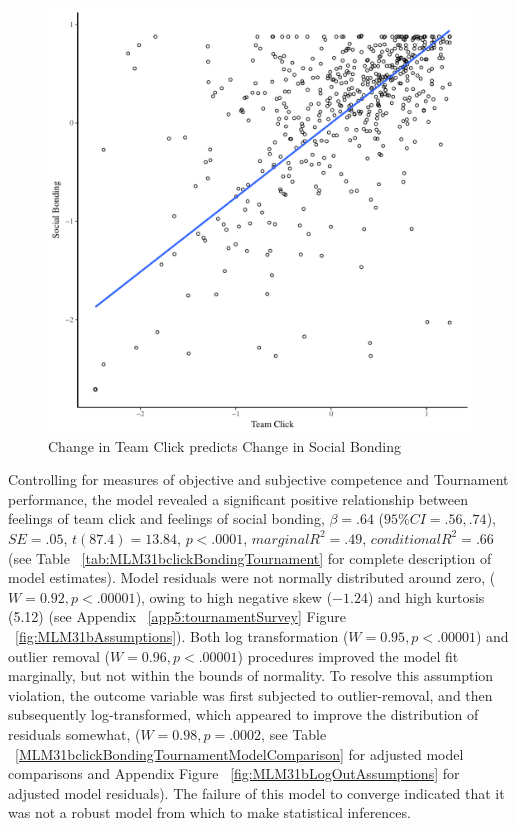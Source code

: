         \begin{figure}[htbp]
          \centering
        \includegraphics[scale=.5]{images/clickBondOverallBasicXY.pdf}
          \caption{Change in Team Click predicts Change in Social Bonding}
          \label{fig:clickBondOverallBasicXY}
        \end{figure}

   Controlling for measures of objective and subjective competence and Tournament performance, the model revealed a significant positive relationship between feelings of team click and feelings of social bonding, $\beta = .64$ ($95\% CI = .56, .74$), $SE = .05$, $t(87.4) = 13.84$, $p < .0001$, $marginal R^2 = .49$, $conditional R^2 = .66$ (see Table ~\ref{tab:MLM31bclickBondingTournament} for complete description of model estimates). Model residuals were not normally distributed around zero, ($W = 0.92, p < .00001$), owing to high negative skew ($-1.24$) and high kurtosis (5.12) (see Appendix ~\ref{app5:tournamentSurvey} Figure ~\ref{fig:MLM31bAssumptions}).
   Both log transformation ($W = 0.95, p < .00001$) and outlier removal ($W = 0.96, p < .00001$) procedures improved the model fit marginally, but not within the bounds of normality.  To resolve this assumption violation, the outcome variable was first subjected to outlier-removal, and then subsequently log-transformed, which appeared to improve the distribution of residuals somewhat, ($W = 0.98, p = .0002$, see Table ~\ref{MLM31bclickBondingTournamentModelComparison} for adjusted model comparisons and Appendix Figure ~\ref{fig:MLM31bLogOutAssumptions} for adjusted model residuals).  The failure of this model to converge indicated that it was not a robust model from which to make statistical inferences.

